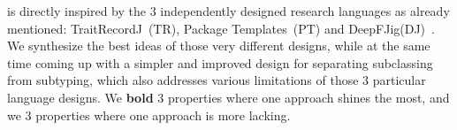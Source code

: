 \name is directly inspired by the $3$ independently designed research languages as already mentioned:
 TraitRecordJ~(TR)\cite{Bettini:2010:ISP:1774088.1774530}, Package Templates~(PT)\cite{KrogdahlMS09} and DeepFJig(DJ)~\cite{deep}.
We synthesize
the best ideas of those very different designs, while at the same time 
coming up with a simpler and improved design for separating
subclassing from subtyping, which also addresses various limitations of those
$3$ particular language designs.
We \textbf{bold} $3$ properties where one approach shines the most,
 and we  $3$ properties where one approach is more lacking.
